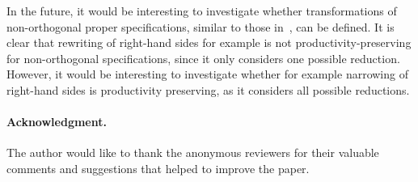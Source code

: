 \documentclass{eptcs}
\begin{document}
In the future, it would be interesting to investigate whether transformations of
non-orthogonal proper specifications, similar to those in~\cite{ZR10}, can be
defined. It is clear that rewriting of right-hand sides for example is not
productivity-preserving for non-orthogonal specifications, since it only
considers one possible reduction.
However, it would be interesting to investigate whether for example narrowing of
right-hand sides is productivity preserving, as it considers all possible
reductions.

\noindent
\paragraph*{Acknowledgment.} The author would like to thank the anonymous
reviewers for their valuable comments and suggestions that helped to improve
the paper.



\end{document}
